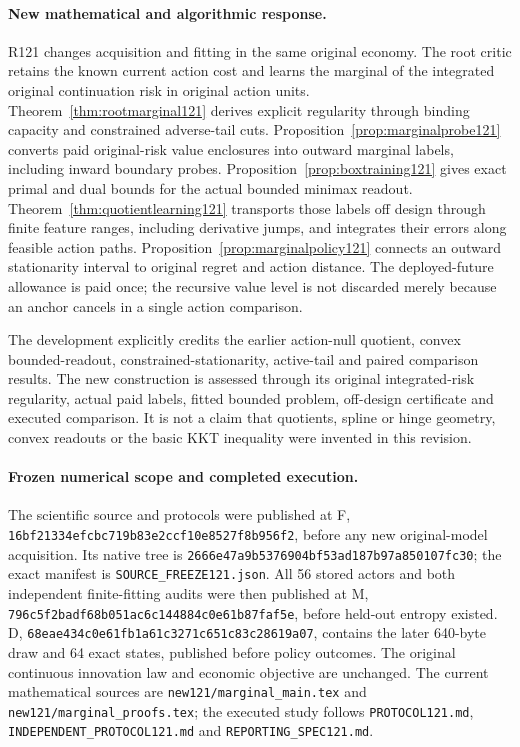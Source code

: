\paragraph{New mathematical and algorithmic response.}
R121 changes acquisition and fitting in the same original economy. The
root critic retains the known current action cost and learns the marginal
of the integrated original continuation risk in original action units.
Theorem~\ref{thm:rootmarginal121} derives explicit regularity through binding
capacity and constrained adverse-tail cuts.
Proposition~\ref{prop:marginalprobe121} converts paid original-risk value
enclosures into outward marginal labels, including inward boundary probes.
Proposition~\ref{prop:boxtraining121} gives exact primal and dual bounds for
the actual bounded minimax readout.
Theorem~\ref{thm:quotientlearning121} transports those labels off design
through finite feature ranges, including derivative jumps, and integrates
their errors along feasible action paths.
Proposition~\ref{prop:marginalpolicy121} connects an outward stationarity
interval to original regret and action distance. The deployed-future
allowance is paid once; the recursive value level is not discarded merely
because an anchor cancels in a single action comparison.

The development explicitly credits the earlier action-null quotient,
convex bounded-readout, constrained-stationarity, active-tail and paired
comparison results. The new construction is assessed through its original
integrated-risk regularity, actual paid labels, fitted bounded problem,
off-design certificate and executed comparison. It is not a claim that
quotients, spline or hinge geometry, convex readouts or the basic KKT
inequality were invented in this revision.

\paragraph{Frozen numerical scope and completed execution.}
The scientific source and protocols were published at F,
\nolinkurl{16bf21334efcbc719b83e2ccf10e8527f8b956f2}, before any new
original-model acquisition. Its native tree is
\nolinkurl{2666e47a9b5376904bf53ad187b97a850107fc30}; the exact manifest is
\nolinkurl{SOURCE_FREEZE121.json}. All 56 stored actors and both independent
finite-fitting audits were then published at M,
\nolinkurl{796c5f2badf68b051ac6c144884c0e61b87faf5e}, before held-out
entropy existed. D, \nolinkurl{68eae434c0e61fb1a61c3271c651c83c28619a07},
contains the later 640-byte draw and 64 exact states, published before policy
outcomes. The original continuous innovation law and economic objective are
unchanged. The current mathematical sources are
\nolinkurl{new121/marginal_main.tex} and
\nolinkurl{new121/marginal_proofs.tex}; the executed study follows
\nolinkurl{PROTOCOL121.md}, \nolinkurl{INDEPENDENT_PROTOCOL121.md} and
\nolinkurl{REPORTING_SPEC121.md}.

